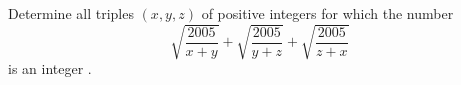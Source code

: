 Determine all triples $\left( x,y,z\right)$ of positive integers for which the number \[ \sqrt{\frac{2005}{x+y}}+\sqrt{\frac{2005}{y+z}}+\sqrt{\frac{2005}{z+x}} \] is an integer .